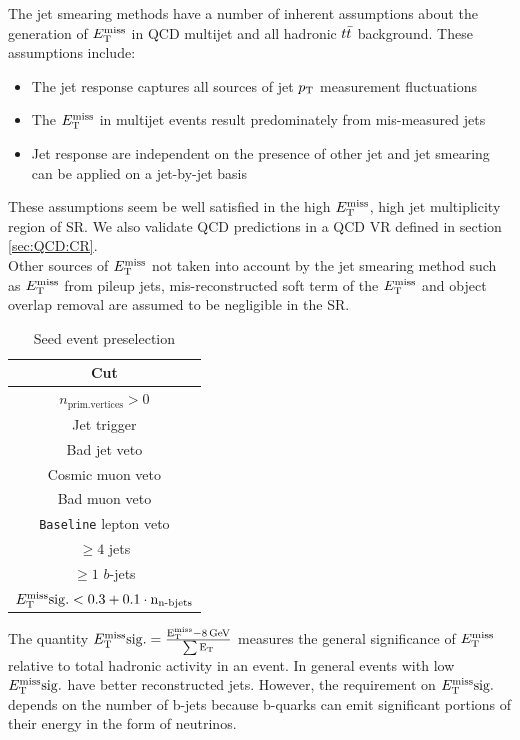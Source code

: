 \indent The jet smearing methods have a number of inherent assumptions about the generation of $E_{\mathrm{T}}^{\mathrm{miss}}$ in QCD multijet and all hadronic $t\bar{t}$ background.  These assumptions include: \\

\begin{itemize}
\item The jet response captures all sources of jet $p_{\mathrm{T}}$ measurement fluctuations
\item The $E_{\mathrm{T}}^{\mathrm{miss}}$ in multijet events result predominately from mis-measured jets
\item Jet response are independent on the presence of other jet and jet smearing can be applied on a jet-by-jet basis
\end{itemize}

\indent These assumptions seem be well satisfied in the high $E_{\mathrm{T}}^{\mathrm{miss}}$, high jet multiplicity region of SR.   We also validate QCD predictions in a QCD VR defined in section \ref{sec:QCD:CR}.\\

\indent Other sources of $E_{\mathrm{T}}^{\mathrm{miss}}$ not taken into account by the jet smearing method such as $E_{\mathrm{T}}^{\mathrm{miss}}$ from pileup jets, mis-reconstructed soft term of the $E_{\mathrm{T}}^{\mathrm{miss}}$ and object overlap removal are assumed to be negligible in the SR. \\

 \begin{table}[htp]
 \caption{Seed event preselection}
 \begin{center}
 \begin{tabular}{c} \hline
   Cut\\ \hline
   $n_\mathrm{prim. vertices} > 0$\\
   Jet trigger\\
   Bad jet veto\\
   Cosmic muon veto\\
   Bad muon veto\\
   {\tt Baseline} lepton veto\\
   $\geq 4$ jets\\
   $\geq 1$ $b$-jets\\
   $E_{\mathrm{T}}^{\mathrm{miss}}\rm{sig.} < 0.3 + 0.1\cdot n_{\textup{n-bjets}}$ \\ \hline
 \end{tabular}
 \end{center}
 \label{tb:seed_events_presel}
 \end{table}

\indent The quantity $E_{\mathrm{T}}^{\mathrm{miss}}\rm{sig.}=\frac{ E_{\mathrm{T}}^{\mathrm{miss}}-8\rm{\,GeV} } {\sum E_\mathrm{T} }$ measures the general significance of $E_{\mathrm{T}}^{\mathrm{miss}}$ relative to total hadronic activity in an event.  In general events with low $E_{\mathrm{T}}^{\mathrm{miss}}\rm{sig.}$ have better reconstructed jets.  However, the requirement on $E_{\mathrm{T}}^{\mathrm{miss}}\rm{sig.}$ depends on the number of b-jets because b-quarks can emit significant portions of their energy in the form of neutrinos.  \\

